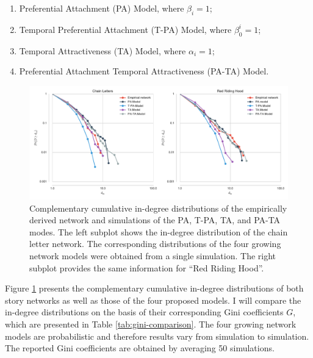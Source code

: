 \begin{enumerate}
\item Preferential Attachment (PA) Model, where $\beta_i = 1$;
\item Temporal Preferential Attachment (T-PA) Model, where $\beta^i_0 = 1$;
\item Temporal Attractiveness (TA) Model, where $\alpha_i = 1$;
\item Preferential Attachment Temporal Attractiveness (PA-TA) Model.
\end{enumerate}

\begin{figure}
\centering
\includegraphics[width=\textwidth]{images/degree-comp.pdf}
\caption{Complementary cumulative in-degree distributions of the empirically derived network and simulations of the PA, T-PA, TA, and PA-TA modes. The left subplot shows the in-degree distribution of the chain letter network. The corresponding distributions of the four growing network models were obtained from a single simulation. The right subplot provides the same information for ``Red Riding Hood''.}
\label{fig:degree-model-comparisons}
\end{figure}

Figure \ref{fig:degree-model-comparisons} presents the complementary cumulative in-degree distributions of both story networks as well as those of the four proposed models. I will compare the in-degree distributions on the basis of their corresponding Gini coefficients $G$, which are presented in Table \ref{tab:gini-comparison}. The four growing network models are probabilistic and therefore results vary from simulation to simulation. The reported Gini coefficients are obtained by averaging 50 simulations. 

